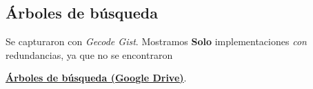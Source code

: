 
\subsection{Árboles de búsqueda}\label{sec:04-acertijo-logico-arboles}

Se capturaron con \textit{Gecode Gist}. Mostramos \textbf{Solo} implementaciones \emph{con} redundancias, ya que no se encontraron 

\href{https://drive.google.com/drive/folders/125bijiUVxOe8lKL5cBToh5QjyLDW0jIM?usp=sharing}{\textbf{Árboles de búsqueda (Google Drive)}}.
